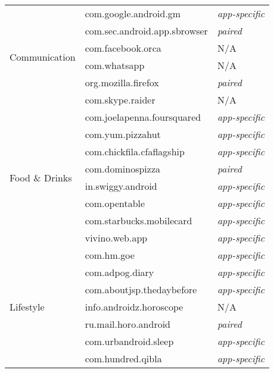 \begin{table}
\begin{tabular}{|l|l|l|}
         \hline
         \multirow{6}{*}{Communication} & com.google.android.gm & \textit{app-specific} \\ \cline{2-3}
        & com.sec.android.app.sbrowser & \textit{paired}\\\cline{2-3}
        & com.facebook.orca & N/A \\ \cline{2-3}
        & com.whatsapp & N/A \\ \cline{2-3}
        & org.mozilla.firefox & \textit{paired} \\ \cline{2-3}
        & com.skype.raider & N/A \\ \hline
        \multirow{8}{*}{Food \& Drinks} & com.joelapenna.foursquared & \textit{app-specific} \\ \cline{2-3}
        & com.yum.pizzahut & \textit{app-specific} \\ \cline{2-3}
        & com.chickfila.cfaflagship&\textit{app-specific}  \\ \cline{2-3}
        & com.dominospizza & \textit{paired} \\ \cline{2-3}
        & in.swiggy.android &\textit{app-specific}  \\ \cline{2-3}
        & com.opentable & \textit{app-specific} \\ \cline{2-3}
        & com.starbucks.mobilecard & \textit{app-specific} \\ \cline{2-3}
       & vivino.web.app& \textit{app-specific} \\ \hline
         \multirow{7}{*}{Lifestyle} & com.hm.goe  & \textit{app-specific} \\ \cline{2-3}
        & com.adpog.diary  & \textit{app-specific} \\ \cline{2-3}
       &  com.aboutjsp.thedaybefore  & \textit{app-specific} \\ \cline{2-3}
       &  info.androidz.horoscope  & N/A \\ \cline{2-3}
        & ru.mail.horo.android & \textit{paired} \\ \cline{2-3}
       &  com.urbandroid.sleep & \textit{app-specific} \\ \cline{2-3}
        & com.hundred.qibla & \textit{app-specific}\\
         \hline
    \end{tabular}
    \label{tab:apps1}
\end{table}

